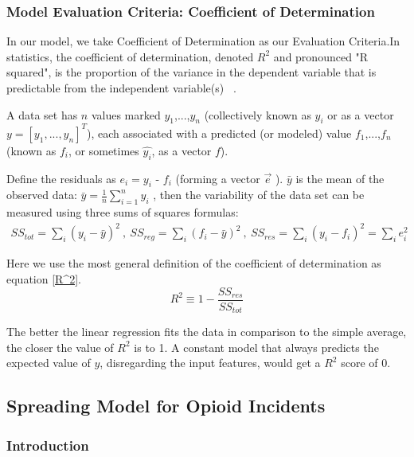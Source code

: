 \documentclass{mcmthesis}
\begin{document}
    

\subsubsection{Model Evaluation Criteria:  Coefficient of Determination}
    
    In our model, we take  Coefficient of Determination as our Evaluation Criteria.In statistics, the coefficient of determination, denoted $R^2$ and pronounced "R squared", is the proportion of the variance in the dependent variable that is predictable from the independent variable(s) ~\cite{R}. 
    
    A data set has $n$ values marked $y_1$,...,$y_n$ (collectively known as $y_i$ or as a vector $y = [y_1,...,y_n]^T$), each associated with a predicted (or modeled) value $f_1$,...,$f_n$ (known as $f_i$, or sometimes $\hat{y_i}$, as a vector $f$).

    Define the residuals as $e_i = y_i$ - $f_i$ (forming a vector $\vec{e}$ ). $\bar{y}$ is the mean of the observed data: 
    $\bar{y}=\frac{1}{n}\sum_{i=1}^n y_{i}$ , then the variability of the data set can be measured using three sums of squares formulas:
    \begin{gather*}
        SS_{tot}=\sum _{i} \left ( y_i-\bar{y} \right )^2 ~,~
         SS_{reg}=\sum _{i} \left ( f_i-\bar{y} \right )^2 ~,~
       SS_{res}=\sum _{i} \left ( y_i-f_i \right )^2=\sum _{i}e_i^2
     \end{gather*}
     
    Here we use the most general definition of the coefficient of determination as equation \ref{R^2}.
    \begin{equation}\label{R^2}
        R^2\equiv 1-\frac{SS_{res}}{SS_{tot}}
    \end{equation}
    
   The better the linear regression fits the data in comparison to the simple average, the closer the value of $R^{2}$ is to 1. A constant model that always predicts the expected value of $y$, disregarding the input features, would get a $R^2$ score of 0.

\subsection{ Spreading Model for Opioid Incidents }

\subsubsection{Introduction}    
\end{document}
